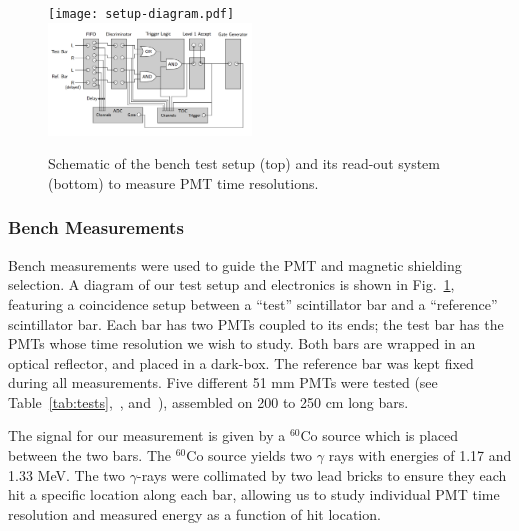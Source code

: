 \documentclass[3p,final,twocolumn]{elsarticle}
\begin{document}
\begin{figure}[tb]
	\centering
		\texttt{[image: setup-diagram.pdf]} \\
		\includegraphics[width=0.48\textwidth]{electr_setup.png}
	\caption{Schematic of the bench test setup (top) and its
          read-out system (bottom) to measure PMT time resolutions. }
	\label{fig:test_stand_setup}
\end{figure}

\subsubsection{Bench Measurements}

Bench measurements were used to guide the PMT and magnetic shielding
selection.  A diagram of our test setup and electronics is shown in
Fig.~\ref{fig:test_stand_setup}, featuring a coincidence setup between
a ``test'' scintillator bar and a ``reference'' scintillator bar.  Each
bar has two PMTs coupled to its ends; the test bar has the PMTs whose
time resolution we wish to study.  Both bars are wrapped in an optical
reflector, and placed in a dark-box.  The reference bar was kept fixed
during all measurements. Five different 51 \si{\milli\meter} PMTs were tested (see Table~\ref{tab:tests},~\cite{hamapmts}, and~\cite{pmt9214}), assembled on 200 to 250
\si{\centi\meter} long bars.

The signal for our measurement is given by a $^{60}$Co source which
is placed between the two bars.  The $^{60}$Co source yields two
$\gamma$ rays with energies of 1.17 and 1.33 \si{\mega\electronvolt}.
The two $\gamma$-rays were collimated by two lead bricks to ensure
they each hit a specific location along each bar, allowing us to study individual
PMT time resolution and measured energy as a function of hit location.
\end{document}
